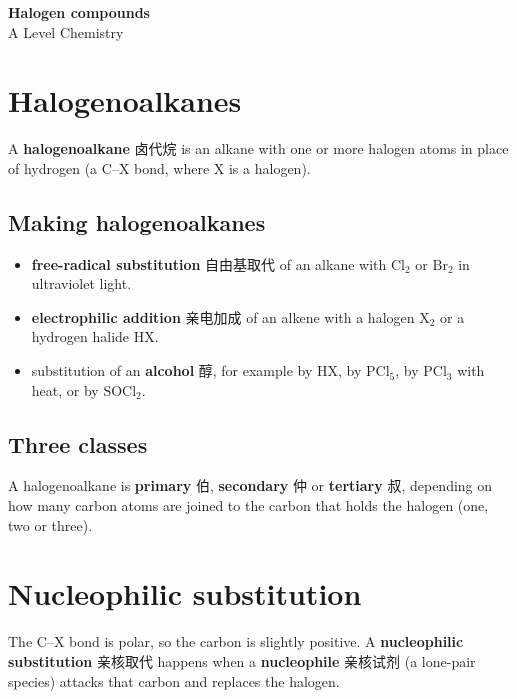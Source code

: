 \documentclass[11pt]{article}
\begin{document}
\begin{center}
  {\LARGE\bfseries Halogen compounds}\\[0.35em]
  {\large A Level Chemistry}
\end{center}
\vspace{0.6em}

\section*{Halogenoalkanes}

A \textbf{halogenoalkane} 卤代烷 is an alkane with one or more halogen atoms in place of hydrogen (a C–X bond, where X is a halogen).

\subsection*{Making halogenoalkanes}

\begin{itemize}
\item \textbf{free-radical substitution} 自由基取代 of an alkane with $\text{Cl}_2$ or $\text{Br}_2$ in ultraviolet light.

\item \textbf{electrophilic addition} 亲电加成 of an alkene with a halogen $\text{X}_2$ or a hydrogen halide $\text{HX}$.

\item substitution of an \textbf{alcohol} 醇, for example by $\text{HX}$, by $\text{PCl}_5$, by $\text{PCl}_3$ with heat, or by $\text{SOCl}_2$.

\end{itemize}

\subsection*{Three classes}

A halogenoalkane is \textbf{primary} 伯, \textbf{secondary} 仲 or \textbf{tertiary} 叔, depending on how many carbon atoms are joined to the carbon that holds the halogen (one, two or three).

\section*{Nucleophilic substitution}

The C–X bond is polar, so the carbon is slightly positive. A \textbf{nucleophilic substitution} 亲核取代 happens when a \textbf{nucleophile} 亲核试剂 (a lone-pair species) attacks that carbon and replaces the halogen.
\end{document}
